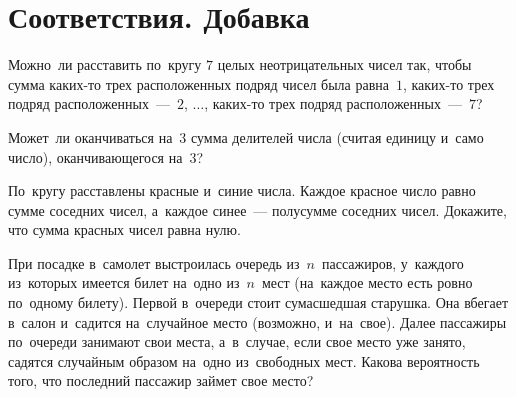 
\section*{Соответствия. Добавка}


\begin{problems}

\item
Можно~ли расставить по~кругу $7$ целых неотрицательных чисел так, чтобы сумма
каких-то трех расположенных подряд чисел была равна~$1$,
каких-то трех подряд расположенных~---~$2$, $\ldots$,
каких-то трех подряд расположенных~---~$7$?

\item
Может~ли оканчиваться на~$3$ сумма делителей числа (считая единицу и~само
число), оканчивающегося на~$3$?

\item
По~кругу расставлены красные и~синие числа.
Каждое красное число равно сумме соседних чисел, а~каждое синее~--- полусумме
соседних чисел.
Докажите, что сумма красных чисел равна нулю.

\item
При посадке в~самолет выстроилась очередь из~$n$~пассажиров, у~каждого
из~которых имеется билет на~одно из~$n$~мест (на~каждое место есть ровно
по~одному билету).
Первой в~очереди стоит сумасшедшая старушка.
Она вбегает в~салон и~садится на~случайное место (возможно, и~на~свое).
Далее пассажиры по~очереди занимают свои места, а~в~случае, если свое место уже
занято, садятся случайным образом на~одно из~свободных мест.
Какова вероятность того, что последний пассажир займет свое место?

\end{problems}

